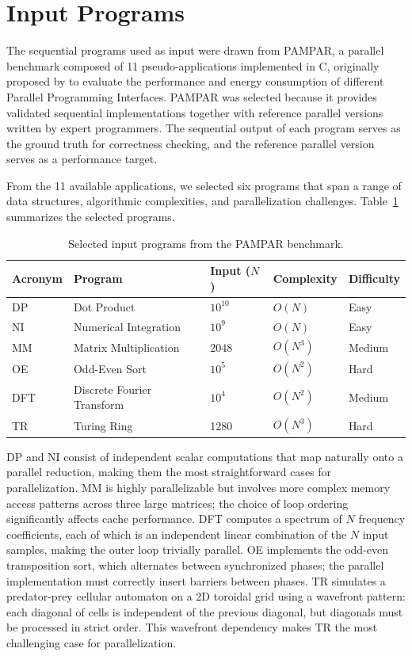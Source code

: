 \section{Input Programs}
\label{sec:programs}

The sequential programs used as input were drawn from PAMPAR, a parallel benchmark composed of 11 pseudo-applications implemented in C, originally proposed by  to evaluate the performance and energy consumption of different Parallel Programming Interfaces.
PAMPAR was selected because it provides validated sequential implementations together with reference parallel versions written by expert programmers.
The sequential output of each program serves as the ground truth for correctness checking, and the reference parallel version serves as a performance target.

From the 11 available applications, we selected six programs that span a range of data structures, algorithmic complexities, and parallelization challenges.
Table~\ref{tab:programs} summarizes the selected programs.

\begin{table}[ht]
\centering
\caption{Selected input programs from the PAMPAR benchmark.}
\label{tab:programs}
\begin{tabular}{lllll}
\toprule
\textbf{Acronym} & \textbf{Program} & \textbf{Input ($N$)} & \textbf{Complexity} & \textbf{Difficulty} \\
\midrule
DP  & Dot Product                & $10^{10}$  & $O(N)$   & Easy   \\
NI  & Numerical Integration      & $10^{9}$   & $O(N)$   & Easy   \\
MM  & Matrix Multiplication      & 2048       & $O(N^3)$ & Medium \\
OE  & Odd-Even Sort              & $10^{5}$   & $O(N^2)$ & Hard   \\
DFT & Discrete Fourier Transform & $10^{4}$   & $O(N^2)$ & Medium \\
TR  & Turing Ring                & 1280       & $O(N^3)$ & Hard   \\
\bottomrule
\end{tabular}
\end{table}

DP and NI consist of independent scalar computations that map naturally onto a parallel reduction, making them the most straightforward cases for parallelization.
MM is highly parallelizable but involves more complex memory access patterns across three large matrices; the choice of loop ordering significantly affects cache performance. 
DFT computes a spectrum of $N$ frequency coefficients, each of which is an independent linear combination of the $N$ input samples, making the outer loop trivially parallel.
OE implements the odd-even transposition sort, which alternates between synchronized phases; the parallel implementation must correctly insert barriers between phases.
TR simulates a predator-prey cellular automaton on a 2D toroidal grid using a wavefront pattern: each diagonal of cells is independent of the previous diagonal, but diagonals must be processed in strict order.
This wavefront dependency makes TR the most challenging case for parallelization.


